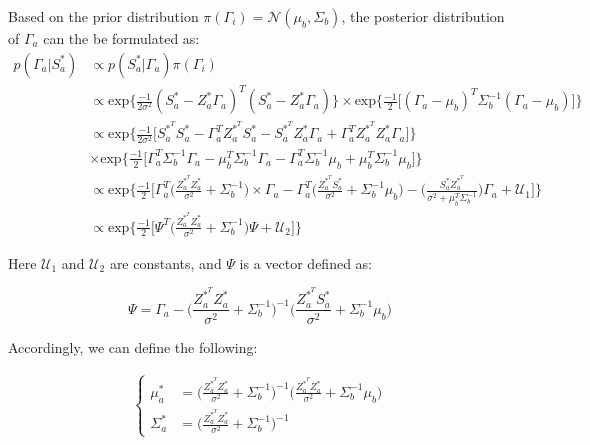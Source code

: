 \documentclass{article}
\begin{document}
Based on the prior distribution $\pi(\Gamma_i) = \mathcal{N}(\mu_b, \Sigma_b)$, the posterior distribution of $\Gamma_a$ can the be formulated as: 
\begin{align}
p(\Gamma_a|S_a^*) &\propto p(S_a^*|\Gamma_a)\pi(\Gamma_i)\\
&\propto \text{exp} \Bigg\{\frac{-1}{2\sigma^2} (S_a^* - Z_a^*\Gamma_a)^T(S_a^* - Z_a^*\Gamma_a) \Bigg\} \times \text{exp} \Bigg\{ \frac{-1}{2}\Bigg[(\Gamma_a - \mu_b)^T\Sigma_b^{-1}(\Gamma_a - \mu_b) \Bigg] \Bigg\}\\
&\propto \text{exp} \Bigg\{ \frac{-1}{2\sigma^2} \Bigg[ S_a^{*^T}S_a^* - \Gamma_a^TZ_a^{*^T}S_a^* - S_a^{*^T}Z_a^*\Gamma_a + \Gamma_a^TZ_a^{*^T}Z_a^*\Gamma_a \Bigg]\Bigg\}\\
&\times \text{exp} \Bigg\{\frac{-1}{2} \Bigg[\Gamma_a^T\Sigma_b^{-1}\Gamma_a - \mu_b^T\Sigma_b^{-1}\Gamma_a - \Gamma_a^T\Sigma_b^{-1}\mu_b + \mu_b^T\Sigma_b^{-1}\mu_b \Bigg]\Bigg\}\\
&\propto \text{exp} \Bigg\{\frac{-1}{2}\Bigg[ \Gamma_a^T\Big( \frac{Z_a^{*^T}Z_a^*}{\sigma^2} + \Sigma_b^{-1}\Big)\times\Gamma_a  - \Gamma_a^T\Bigg(\frac{Z_a^{*^T}S_a^*}{\sigma^2} + \Sigma_b^{-1}\mu_b\Bigg) - \Bigg(\frac{S_a^*Z_a^{*^T}}{\sigma^2 + \mu_b^T\Sigma_b^{-1}}\Bigg)\Gamma_a + \mathcal{U}_1\Bigg] \Bigg\}\\
&\propto \text{exp} \Bigg\{ \frac{-1}{2}\Bigg[\Psi^T \Bigg( \frac{Z_a^{*^T}Z_a^*}{\sigma^2} + \Sigma_b^{-1}\Bigg)\Psi +\mathcal{U}_2 \Bigg]      \Bigg\}
\end{align}


Here $\mathcal{U}_1$ and $\mathcal{U}_2$ are constants, and $\Psi$ is a vector defined as: 

\begin{equation}
    \Psi = \Gamma_a - \Bigg(\frac{Z_a^{*^T}Z_a^*}{\sigma^2} + \Sigma_b^{-1}\Bigg)^{-1} \Bigg( \frac{Z_a^{*^T}S_a^*}{\sigma^2} + \Sigma_b^{-1}\mu_b\Bigg)
\end{equation}

Accordingly, we can define the following:

\begin{align}
    \begin{cases}
    \mu_a^* &= \Big( \frac{Z_a^{*^T}Z_a^*}{\sigma^2} + \Sigma_b^{-1}\Big)^{-1} \Big( \frac{Z_a^{*^T}Z_a^*}{\sigma^2} + \Sigma_b^{-1}\mu_b \Big)\\
    \Sigma_a^* &= \Big( \frac{Z_a^{*^T} Z_a^*}{\sigma^2} + \Sigma_b^{-1}\Big)^{-1}
    \end{cases}
\end{align}
\end{document}
